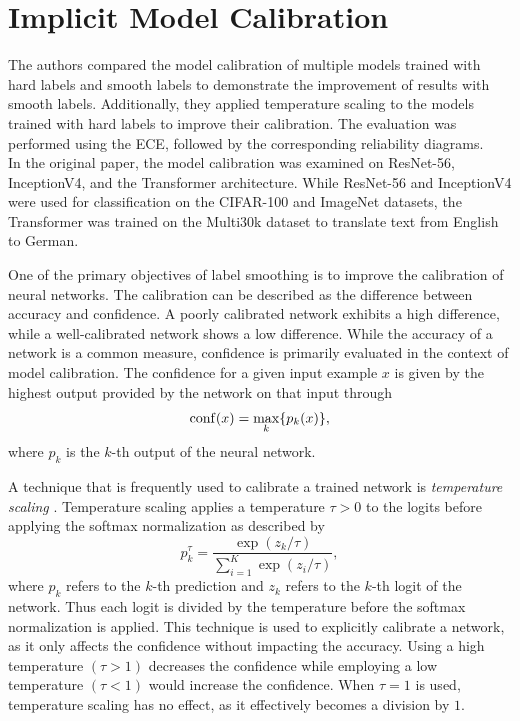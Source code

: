 \section{Implicit Model Calibration}\label{sec:imc}
\label{sec:model_calibration_basics}
The authors compared the model calibration of multiple models trained with hard labels and smooth labels to demonstrate the improvement of results with smooth labels. Additionally, they applied temperature scaling to the models trained with hard labels to improve their calibration. The evaluation was performed using the ECE, followed by the corresponding reliability diagrams.\\

In the original paper, the model calibration was examined on ResNet-56, InceptionV4, and the Transformer architecture. While ResNet-56 and InceptionV4 were used for classification on the CIFAR-100 and ImageNet datasets, the Transformer was trained on the Multi30k dataset to translate text from English to German.

One of the primary objectives of label smoothing is to improve the calibration of neural networks. The calibration can be described as the difference between accuracy and confidence. A poorly calibrated network exhibits a high difference, while a well-calibrated network shows a low difference. While the accuracy of a network is a common measure, confidence is primarily evaluated in the context of model calibration. The confidence for a given input example $x$ is given by the highest output provided by the network on that input through
$$\operatorname{conf}(x) = \max_k\{p_k(x)\},$$
where $p_k$ is the $k$-th output of the neural network.

A technique that is frequently used to calibrate a trained network is \textit{temperature scaling} \cite{Guo2017}. Temperature scaling applies a temperature $\tau>0$ to the logits before applying the softmax normalization as described by
$$p_k^{\tau} = \frac{\exp(z_k/\tau)}{\sum_{i=1}^K \exp(z_i/\tau)},$$
where $p_k$ refers to the $k$-th prediction and $z_k$ refers to the $k$-th logit of the network. Thus each logit is divided by the temperature before the softmax normalization is applied. This technique is used to explicitly calibrate a network, as it only affects the confidence without impacting the accuracy. Using a high temperature $(\tau > 1)$ decreases the confidence while employing a low temperature $(\tau < 1)$ would increase the confidence. When $\tau=1$ is used, temperature scaling has no effect, as it effectively becomes a division by $1$.\\

